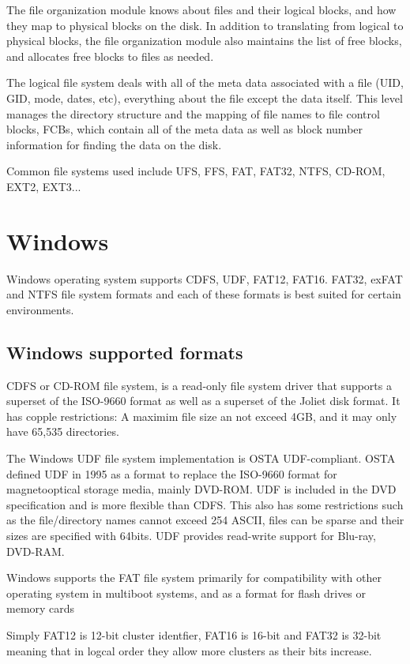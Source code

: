 \documentclass[letterpaper,10pt,draftclsnofoot,onecolumn]{IEEEtran}
\begin{document}
The file organization module knows about files and their logical blocks, and how they map to physical blocks on the disk. In addition to translating from logical to physical blocks, the file organization module also maintains the list of free blocks, and allocates free blocks to files as needed.

The logical file system deals with all of the meta data associated with a file (UID, GID, mode, dates, etc), everything about the file except the data itself. This level manages the directory structure and the mapping of file names to file control blocks, FCBs, which contain all of the meta data as well as block number information for finding the data on the disk.

Common file systems used include UFS, FFS, FAT, FAT32, NTFS, CD-ROM, EXT2, EXT3...
\section*{Windows}

Windows operating system supports CDFS, UDF, FAT12, FAT16. FAT32, exFAT and NTFS file system formats and each of these formats is best suited for certain environments.

\subsection*{Windows supported formats}

CDFS or CD-ROM file system, is a read-only file system driver that supports a superset of the ISO-9660 format as well as a superset of the Joliet disk format. It has copple restrictions: A maximim file size an not exceed 4GB, and it may only have 65,535 directories.\cite{[1]}

The Windows UDF file system implementation is OSTA UDF-compliant. OSTA defined UDF in 1995 as a format to replace the ISO-9660 format for magnetooptical storage media, mainly DVD-ROM. UDF is included in the DVD specification and is more flexible
than CDFS. This also has some restrictions such as the file/directory names cannot exceed 254 ASCII, files can be sparse and their sizes are specified with 64bits. UDF provides read-write support for Blu-ray, DVD-RAM.

Windows supports the FAT file system primarily for compatibility with other operating system in multiboot systems, and as a format for flash drives or memory cards\cite{[1]}

Simply FAT12 is 12-bit cluster identfier, FAT16 is 16-bit and FAT32 is 32-bit meaning that in logcal order they allow more clusters as their bits increase.
\end{document}
